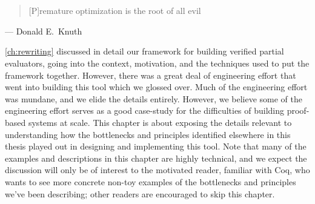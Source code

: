 \chapter{}\label{ch:rewriting-more}
%

\begin{quote}
  [P]remature optimization is the root of all evil
\end{quote}
\begin{flushright}
  --- Donald E.~Knuth~\cite[p.~671]{KnuthPrematureOptimization}
\end{flushright}

\autoref{ch:rewriting} discussed in detail our framework for building verified partial evaluators, going into the context, motivation, and the techniques used to put the framework together.
However, there was a great deal of engineering effort that went into building this tool which we glossed over.
Much of the engineering effort was mundane, and we elide the details entirely.
However, we believe some of the engineering effort serves as a good case-study for the difficulties of building proof-based systems at scale.
This chapter is about exposing the details relevant to understanding how the bottlenecks and principles identified elsewhere in this thesis played out in designing and implementing this tool.
Note that many of the examples and descriptions in this chapter are highly technical, and we expect the discussion will only be of interest to the motivated reader, familiar with Coq, who wants to see more concrete non-toy examples of the bottlenecks and principles we've been describing; other readers are encouraged to skip this chapter.


